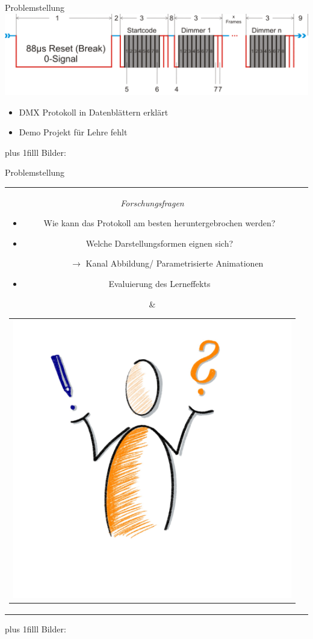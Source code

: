 \documentclass[Nike]{tuberlinbeamer}
\newcommand{\customcite}[1]{
	\vskip0pt plus 1filll
	\color{grau}
	\raggedleft \tiny Bilder: \cite{#1}
}
\begin{document}
\begin{frame}{Problemstellung}
	\includegraphics[width=\textwidth]{pictures/dmx-timing}
	\begin{itemize}
		\item DMX Protokoll in Datenblättern erklärt
		\item Demo Projekt für Lehre fehlt
	\end{itemize}
	\customcite{dmx_timing}
\end{frame}
\begin{frame}{Problemstellung}
	\begin{tabular}{cl}  
		\parbox{0.45\linewidth}{
		\emph{Forschungsfragen}
		\begin{itemize}
			\item Wie kann das Protokoll am besten heruntergebrochen werden?
			\item Welche Darstellungsformen eignen sich?
			\begin{enumerate}[label=\arabic*.,start=\value{enumi}]
				\item[$\rightarrow$] Kanal Abbildung/ Parametrisierte Animationen
			\end{enumerate}
			\item Evaluierung des Lerneffekts
		\end{itemize}
		}
		&
		\begin{tabular}{c}
			\includegraphics[height=\textheight - 13pt]{pictures/oder}
		\end{tabular}
	\end{tabular}
	\customcite{fragen}
\end{frame}
\end{document}
